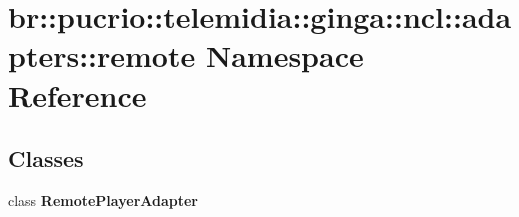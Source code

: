 \section{br::pucrio::telemidia::ginga::ncl::adapters::remote Namespace Reference}
\label{namespacebr_1_1pucrio_1_1telemidia_1_1ginga_1_1ncl_1_1adapters_1_1remote}


\subsection*{Classes}
\begin{CompactItemize}
\item 
class {\bf RemotePlayerAdapter}
\end{CompactItemize}
